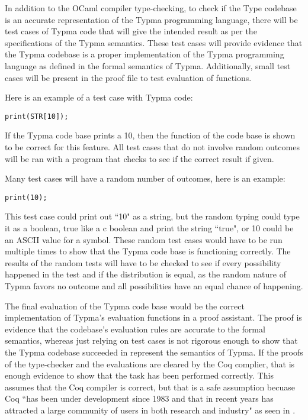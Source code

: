 \documentclass[10pt,twocolumn]{article}
\begin{document}
In addition to the OCaml compiler type-checking, to check if the Type codebase is an accurate representation of the Typma programming language, there will be test cases of Typma code that will give the intended result as per the specifications of the Typma semantics. These test cases will provide evidence that the Typma codebase is a proper implementation of the Typma programming language as defined in the formal semantics of Typma. Additionally, small test cases will be present in the proof file to test evaluation of functions.

Here is an example of a test case with Typma code:

\begin{lstlisting}
print(STR[10]);
\end{lstlisting}

If the Typma code base prints a 10, then the function of the code base is shown to be correct for this feature. All test cases that do not involve random outcomes will be ran with a program that checks to see if the correct result if given.

Many test cases will have a random number of outcomes, here is an example:

\begin{lstlisting}
print(10);
\end{lstlisting}

This test case could print out ``10" as a string, but the random typing could type it as a boolean, true like a c boolean and print the string ``true", or 10 could be an ASCII value for a symbol. These random test cases would have to be run multiple times to show that the Typma code base is functioning correctly. The results of the random tests will have to be checked to see if every possibility happened in the test and if the distribution is equal, as the random nature of Typma favors no outcome and all possibilities have an equal chance of happening.

The final evaluation of the Typma code base would be the correct implementation of Typma's evaluation functions in a proof assistant.
The proof is evidence that the codebase's evaluation rules are accurate to the formal semantics, whereas just relying on test cases is not rigorous enough to show that the Typma codebase succeeded in represent the semantics of Typma. If the proofs of the type-checker and the evaluations are cleared by the Coq complier, that is enough evidence to show that the task has been performed correctly. This assumes that the Coq compiler is correct, but that is a safe assumption becuase Coq ``has been under development since 1983 and that in recent years has attracted a large community of users in both research and industry" as seen in \textcite{Pierce2021Software}.
\end{document}
